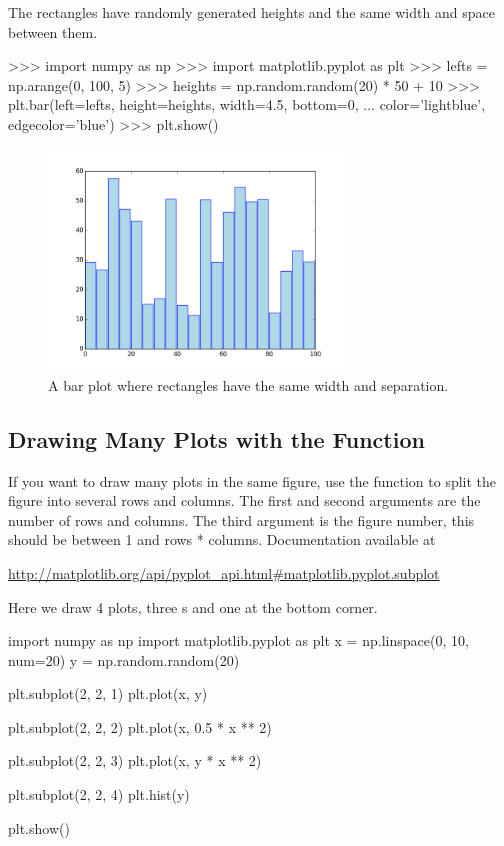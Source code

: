 \documentclass[11pt]{cselabheader}
\begin{document}
The rectangles have randomly generated heights and the same width and space
between them.

\begin{pyconcode}
>>> import numpy as np
>>> import matplotlib.pyplot as plt
>>> lefts = np.arange(0, 100, 5)
>>> heights = np.random.random(20) * 50 + 10
>>> plt.bar(left=lefts, height=heights, width=4.5, bottom=0,
...         color='lightblue', edgecolor='blue')
>>> plt.show()
\end{pyconcode}

\begin{figure}[H]
  \centering
  \includegraphics[width=0.7\textwidth]{img/matplotlib_bar.png}
  \caption{A bar plot where rectangles have the same width and separation.}
\end{figure}

\subsection{Drawing Many Plots with the 
Function}

If you want to draw many plots in the same figure, use the
 function to split the figure into several rows
and columns. The first and second arguments are the number of rows and columns.
The third argument is the figure number, this should be between 1 and
rows * columns. Documentation available at

\begin{center}
\url{http://matplotlib.org/api/pyplot_api.html#matplotlib.pyplot.subplot}
\end{center}

Here we draw 4 plots, three s and one
 at the bottom corner.

\begin{python3code}
import numpy as np
import matplotlib.pyplot as plt
x = np.linspace(0, 10, num=20)
y = np.random.random(20)

plt.subplot(2, 2, 1)
plt.plot(x, y)

plt.subplot(2, 2, 2)
plt.plot(x, 0.5 * x ** 2)

plt.subplot(2, 2, 3)
plt.plot(x, y * x ** 2)

plt.subplot(2, 2, 4)
plt.hist(y)

plt.show()
\end{python3code}
\end{document}
